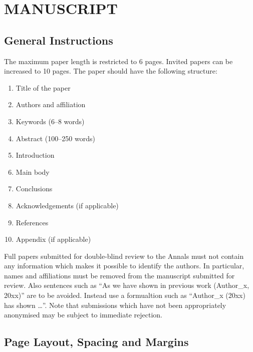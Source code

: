 \documentclass{isprs} %
\begin{document}

\section{MANUSCRIPT}\label{MANUSCRIPT}
 
\sloppy

\subsection{General Instructions}\label{sec:General Instructions}

The maximum paper length is restricted to 6 pages. Invited papers can be increased to 10 pages. The paper should have the following structure: 

\begin{enumerate}
\setlength\itemsep{0em}\setlength\parskip{0em}\setlength\topsep{0em}\setlength\partopsep{0em}\setlength\parsep{0em} 
\item{Title of the paper} 
\item{Authors and affiliation}
\item{Keywords (6--8 words)}
\item{Abstract (100--250 words)}
\item{Introduction}
\item{Main body}
\item{Conclusions}
\item{Acknowledgements (if applicable)}
\item{References}
\item{Appendix (if applicable)}
\end{enumerate}

Full papers submitted for double-blind review to the Annals must not contain any information 
which makes it possible to identify the authors. In particular, names and affiliations must be 
removed from the manuscript submitted for review. Also sentences such as ``As we have shown in 
previous work (Author\_x, 20xx)'' are to be avoided. Instead use a formualtion such 
as ``Author\_x (20xx) has shown \ldots''. Note that submissions which have not been 
appropriately anonymised may be subject to immediate rejection.
\newpage            
\subsection{Page Layout, Spacing and Margins}\label{sec:Page Layout, Spacing and Margins}
\end{document}
